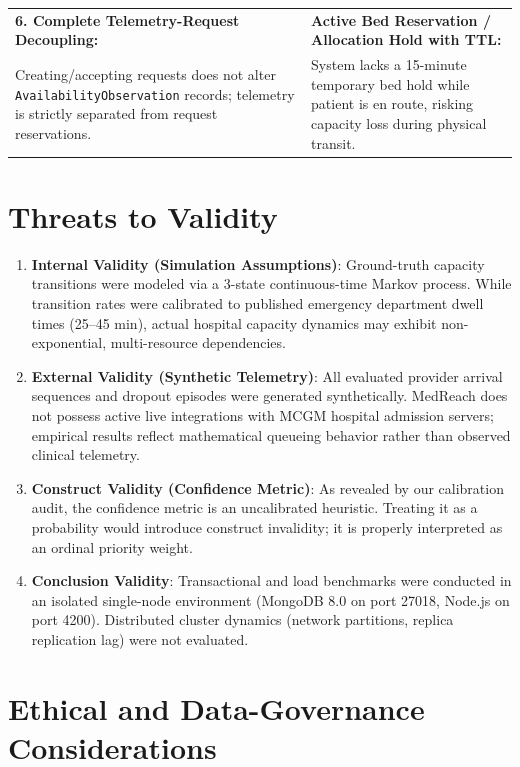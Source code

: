 \documentclass[conference]{IEEEtran}
\begin{document}
\begin{table}[t]
\begin{tabularx}{\linewidth}{X|X}
\midrule
\textbf{6. Complete Telemetry-Request Decoupling:} & \textbf{Active Bed Reservation / Allocation Hold with TTL:} \\
Creating/accepting requests does not alter \texttt{AvailabilityObservation} records; telemetry is strictly separated from request reservations. & System lacks a 15-minute temporary bed hold while patient is en route, risking capacity loss during physical transit. \\
\bottomrule
\end{tabularx}
\end{table}

\section{Threats to Validity}

\begin{enumerate}
    \item \textbf{Internal Validity (Simulation Assumptions)}: Ground-truth capacity transitions were modeled via a 3-state continuous-time Markov process. While transition rates were calibrated to published emergency department dwell times (25--45 min), actual hospital capacity dynamics may exhibit non-exponential, multi-resource dependencies.
    \item \textbf{External Validity (Synthetic Telemetry)}: All evaluated provider arrival sequences and dropout episodes were generated synthetically. MedReach does not possess active live integrations with MCGM hospital admission servers; empirical results reflect mathematical queueing behavior rather than observed clinical telemetry.
    \item \textbf{Construct Validity (Confidence Metric)}: As revealed by our calibration audit, the confidence metric is an uncalibrated heuristic. Treating it as a probability would introduce construct invalidity; it is properly interpreted as an ordinal priority weight.
    \item \textbf{Conclusion Validity}: Transactional and load benchmarks were conducted in an isolated single-node environment (MongoDB 8.0 on port 27018, Node.js on port 4200). Distributed cluster dynamics (network partitions, replica replication lag) were not evaluated.
\end{enumerate}

\section{Ethical and Data-Governance Considerations}
\end{document}
